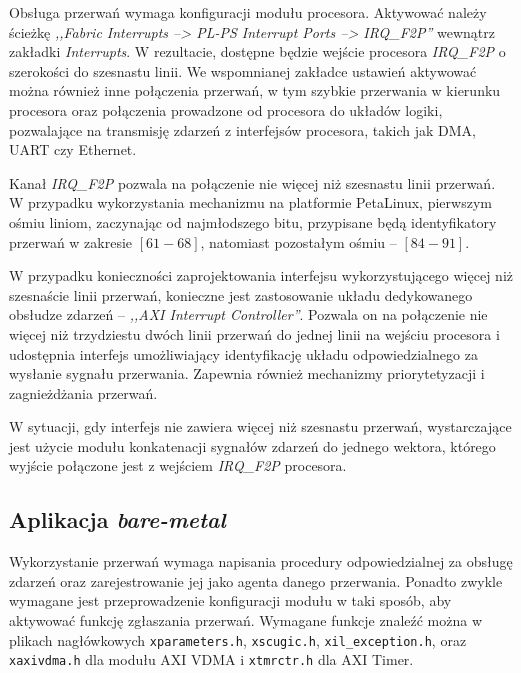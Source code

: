 Obsługa przerwań wymaga konfiguracji modułu procesora. 
Aktywować należy ścieżkę \emph{,,Fabric Interrupts --> PL-PS Interrupt Ports --> IRQ\_F2P''} wewnątrz zakładki \emph{Interrupts}. 
W rezultacie, dostępne będzie wejście procesora \emph{IRQ\_F2P} o szerokości do szesnastu linii. 
We wspomnianej zakładce ustawień aktywować można również inne połączenia przerwań, w tym szybkie przerwania w kierunku procesora oraz połączenia prowadzone od procesora do układów logiki, pozwalające na transmisję zdarzeń z interfejsów procesora, takich jak DMA, UART czy Ethernet.

Kanał \emph{IRQ\_F2P} pozwala na połączenie nie więcej niż szesnastu linii przerwań. 
W przypadku wykorzystania mechanizmu na platformie PetaLinux, pierwszym ośmiu liniom, zaczynając od najmłodszego bitu, przypisane będą identyfikatory przerwań w zakresie $[61-68]$, natomiast pozostałym ośmiu -- $[84-91]$.

W przypadku konieczności zaprojektowania interfejsu wykorzystującego więcej niż szesnaście linii przerwań, konieczne jest zastosowanie układu dedykowanego obsłudze zdarzeń -- \emph{,,AXI Interrupt Controller''}. 
Pozwala on na połączenie nie więcej niż trzydziestu dwóch linii przerwań do jednej linii na wejściu procesora i udostępnia interfejs umożliwiający identyfikację układu odpowiedzialnego za wysłanie sygnału przerwania. 
Zapewnia również mechanizmy priorytetyzacji i zagnieżdżania przerwań.

W sytuacji, gdy interfejs nie zawiera więcej niż szesnastu przerwań, wystarczające jest użycie modułu konkatenacji sygnałów zdarzeń do jednego wektora, którego wyjście połączone jest z wejściem \emph{IRQ\_F2P} procesora.

\subsection{Aplikacja \textit{bare-metal}}

Wykorzystanie przerwań wymaga napisania procedury odpowiedzialnej za obsługę zdarzeń oraz zarejestrowanie jej jako agenta danego przerwania.
Ponadto zwykle wymagane jest przeprowadzenie konfiguracji modułu w taki sposób, aby aktywować funkcję zgłaszania przerwań. %
Wymagane funkcje znaleźć można w plikach nagłówkowych \texttt{xparameters.h}, \texttt{xscugic.h}, \texttt{xil\_exception.h}, oraz \texttt{xaxivdma.h} dla modułu AXI VDMA i \texttt{xtmrctr.h} dla AXI Timer.

